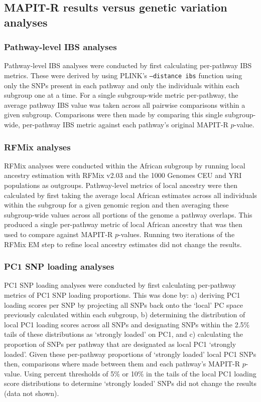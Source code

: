 \subsection*{MAPIT-R results versus genetic variation analyses}
\subsubsection*{Pathway-level IBS analyses}

Pathway-level IBS analyses were conducted by first calculating per-pathway IBS metrics. These were derived by using PLINK's \texttt{--distance ibs} function \citep{Purcell2007} using only the SNPs present in each pathway and only the individuals within each subgroup one at a time. For a single subgroup-wide metric per-pathway, the average pathway IBS value was taken across all pairwise comparisons within a given subgroup. Comparisons were then made by comparing this single subgroup-wide, per-pathway IBS metric against each pathway's original MAPIT-R $p$-value.

\subsubsection{RFMix analyses}

RFMix analyses were conducted within the African subgroup by running local ancestry estimation with RFMix v2.03 \citep{Maples2013} and the 1000 Genomes CEU and YRI populations \citep{Genomes2015} as outgroups. Pathway-level metrics of local ancestry were then calculated by first taking the average local African estimates across all individuals within the subgroup for a given genomic region and then averaging these subgroup-wide values across all portions of the genome a pathway overlaps. This produced a single per-pathway metric of local African ancestry that was then used to compare against MAPIT-R $p$-values. Running two iterations of the RFMix EM step to refine local ancestry estimates did not change the results.

\subsubsection{PC1 SNP loading analyses}

PC1 SNP loading analyses were conducted by first calculating per-pathway metrics of PC1 SNP loading proportions. This was done by: a) deriving PC1 loading scores per SNP by projecting all SNPs back onto the `local' PC space previously calculated within each subgroup, b) determining the distribution of local PC1 loading scores across all SNPs and designating SNPs within the 2.5\% tails of these distributions as `strongly loaded' on PC1, and c) calculating the proportion of SNPs per pathway that are designated as local PC1 `strongly loaded'. Given these per-pathway proportions of `strongly loaded' local PC1 SNPs then, comparisons where made between them and each pathway's MAPIT-R $p$-value. Using percent thresholds of 5\% or 10\% in the tails of the local PC1 loading score distributions to determine `strongly loaded' SNPs did not change the results (data not shown).




